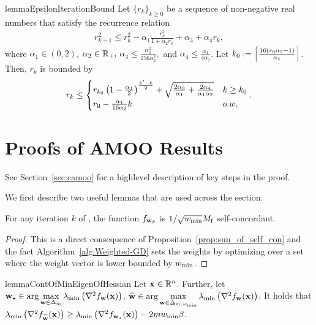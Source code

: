 \begin{restatable}{lemma}{EpsilonIterationBound}\label{lemma:epsilon_app_iteration_bound}
Let $\{ r_k\}_{k\geq 0}$ be a sequence of non-negative real numbers that satisfy the recurrence relation
\begin{align*}
    r_{k+1}^2 \leq r_k^2 -\alpha_1\frac{r_k^2}{1+ \alpha_2 r_k} +\alpha_3 +\alpha_4 r_k,
\end{align*}
where $\alpha_1\in (0,2)$, $\alpha_2\in \mathbb{R}_+,$ $\alpha_3 \leq \frac{\alpha_1^2}{256\alpha^2_2},$ and $\alpha_4\leq \frac{\alpha_1}{4\alpha_2}$. Let $k_0 := \Big\lceil \frac{16 \left(r_0 \alpha_2 - 1\right)}{ \alpha_1} \Big\rceil$. Then, $r_k$ is bounded by
    \begin{align*}
        r_k \leq 
        \begin{cases}
            r_{k_0} \left(1-\frac{\alpha_1}{2}\right)^{\frac{k'-k}{2}} + \sqrt{\frac{2\alpha_3}{\alpha_1}+\frac{2\alpha_4}{\alpha_1 \alpha_2}} & k\geq k_0\\
            r_0 - \frac{\alpha_1}{16\alpha_2}k & o.w.
        \end{cases}.
    \end{align*}
\end{restatable}

\section{Proofs of AMOO Results} \label{app:AMOO_results}

See Section~\ref{sec:camoo} for a highlevel description of key steps in the proof. 

We first describe two useful lemmas that are used across the section.

\begin{lemma}\label{lemma:self_concordant}
For any iteration $k$ of \CAMOO, the function $f_{{\mathbf{w}}_k}$ is $1/\sqrt{{w_{\min}}}M_{\mathrm{f}}$ self-concordant.    
\end{lemma}
\begin{proof}
    This is a direct consequence of Proposition~\ref{prop:sun_of_self_con} and the fact Algorithm~\ref{alg:Weighted-GD} sets the weights by optimizing over a set where the weight vector is lower bounded by ${w_{\min}}$.
\end{proof}


\begin{restatable}{lemma}{ContOfMinEigenOfHessian}
\label{lemma:wmin_minimal_eigenvalue}
Let ${\mathbf{x}}\in \mathbb{R}^n$. Further, let ${\mathbf{w}}_\star \in \arg\max\limits_{{\mathbf{w}}\in \Delta_{m}} \lambda_{\min} \left(\nabla^2 f_{{\mathbf{w}}}({\mathbf{x}})\right)$, $\widehat{{\mathbf{w}}} \in \arg\max\limits_{{\mathbf{w}}\in \Delta_{m,{w_{\min}}}} \lambda_{\min} \left(\nabla^2 f_{{\mathbf{w}}}({\mathbf{x}})\right)$. It holds that $\lambda_{\min}\left(\nabla^2 f_{\widehat{{\mathbf{w}}}}({\mathbf{x}})\right)\geq \lambda_{\min}\left(\nabla^2 f_{{\mathbf{w}}_\star}({\mathbf{x}})\right) - 2m{w_{\min}}\beta$.
\end{restatable}


